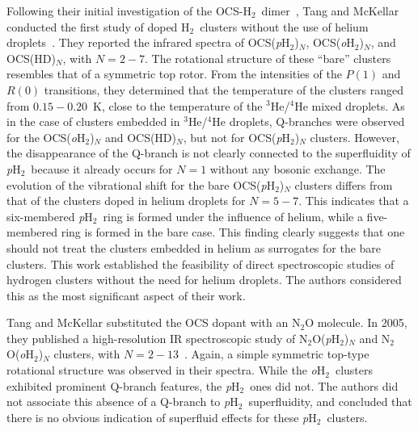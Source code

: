 \documentclass[12pt]{iopart}
\newcommand{\hydrogen}{H$_2$}
\newcommand{\phtwo}{{\em p}H$_2$}
\newcommand{\ohtwo}{{\em o}H$_2$}
\begin{document}
Following their initial investigation of the OCS-\hydrogen~dimer~\cite{tang_ocs_h2_1st}, 
Tang and McKellar conducted the first study of doped \hydrogen~clusters without the use of helium droplets~\cite{tang_h2_ocs_2nd}. 
They reported the infrared spectra of OCS(\phtwo)$_N$, OCS(\ohtwo)$_N$, and OCS(HD)$_N$, with $N=2-7$. 
The rotational structure of these ``bare'' clusters resembles that of a symmetric top rotor. 
From the intensities of the $P(1)$ and $R(0)$ transitions, they determined that the temperature of the clusters ranged from $0.15-0.20$~K, close to the temperature of the $^3$He/$^4$He mixed droplets. 
As in the case of clusters embedded in $^3$He/$^4$He droplets, Q-branches were observed for the OCS(\ohtwo)$_N$ and OCS(HD)$_N$, but not for  OCS(\phtwo)$_N$ clusters. 
However, the disappearance of the Q-branch is not clearly connected to the superfluidity of \phtwo~because it already occurs for $N=1$ without any bosonic exchange. 
The evolution of the vibrational shift for the bare OCS(\phtwo)$_N$ clusters differs from that of the clusters doped in helium droplets for $N=5-7$.
This indicates that  a six-membered \phtwo~ring is formed under the influence of helium, while a five-membered ring is formed in the bare case. 
This finding clearly suggests that one should not treat the clusters embedded in helium as surrogates for the bare clusters. 
This work established the feasibility of direct spectroscopic studies of hydrogen clusters without the need for helium droplets. 
The authors considered this as the most significant aspect of their work.

Tang and McKellar substituted the OCS dopant with an N$_2$O molecule. 
In 2005, they published a high-resolution IR spectroscopic study of N$_2$O(\phtwo)$_N$ and N$_2$O(\ohtwo)$_N$ clusters, 
with $N=2-13$~\cite{tang_n2o_h2}. 
Again, a simple symmetric top-type rotational structure was observed in their spectra. 
While the \ohtwo~clusters exhibited prominent Q-branch features, the \phtwo~ones did not. 
The authors did not associate this absence of a Q-branch to \phtwo~superfluidity, and concluded that there is no obvious indication of superfluid effects for  these \phtwo~clusters.
\end{document}
